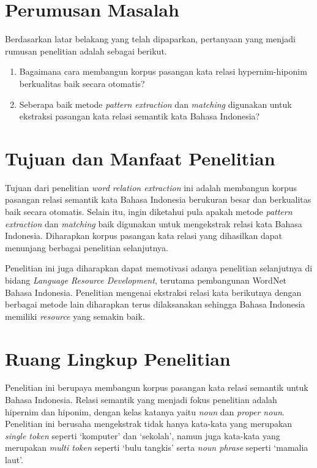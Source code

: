 \section{Perumusan Masalah}
Berdasarkan latar belakang yang telah dipaparkan, pertanyaan yang menjadi rumusan penelitian adalah sebagai berikut.
\begin{enumerate}
	\item Bagaimana cara membangun korpus pasangan kata relasi hypernim-hiponim berkualitas baik secara otomatis?
	\item Seberapa baik metode \textit{pattern extraction} dan \textit{matching} digunakan untuk ekstraksi pasangan kata relasi semantik kata Bahasa Indonesia?
\end{enumerate}

\section{Tujuan dan Manfaat Penelitian}
Tujuan dari penelitian \textit{word relation extraction} ini adalah membangun korpus pasangan relasi semantik kata Bahasa Indonesia berukuran besar dan berkualitas baik secara otomatis. Selain itu, ingin diketahui pula apakah metode \textit{pattern extraction} dan \textit{matching} baik digunakan untuk mengekstrak relasi kata Bahasa Indonesia. Diharapkan korpus pasangan kata relasi yang dihasilkan dapat menunjang berbagai penelitian selanjutnya.

Penelitian ini juga diharapkan dapat memotivasi adanya penelitian selanjutnya di bidang \textit{Language Resource Development}, terutama pembangunan WordNet Bahasa Indonesia. Penelitian mengenai ekstraksi relasi kata berikutnya dengan berbagai metode lain diharapkan terus dilaksanakan sehingga Bahasa Indonesia memiliki \textit{resource} yang semakin baik.

\section{Ruang Lingkup Penelitian}
Penelitian ini berupaya membangun korpus pasangan kata relasi semantik untuk Bahasa Indonesia. Relasi semantik yang menjadi fokus penelitian adalah hipernim dan hiponim, dengan kelas katanya yaitu \textit{noun} dan \textit{proper noun}. Penelitian ini berusaha mengekstrak tidak hanya kata-kata yang merupakan \textit{single token} seperti `komputer' dan `sekolah', namun juga kata-kata yang merupakan \textit{multi token} seperti `bulu tangkis' serta \textit{noun phrase} seperti `mamalia laut'.

